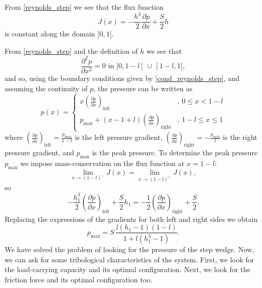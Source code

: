 From \eqref{reynolds_step} we see that the flux function
\begin{equation}
J(x)=-\frac{h^3}{2}\frac{\partial p}{\partial x}+\frac{S}{2}h\label{eq:flux_step}
\end{equation}
is constant along the domain $]0,1[$.

From \eqref{reynolds_step} and the definition of $h$ we see that
\begin{equation*}
\frac{\partial^2 p}{\partial x^2}=0\text{ in }]0,1-l[\,\cup\,]1-l,1[,
\end{equation*}
and so, using the boundary conditions given by \eqref*{cond_reynolds_step}, and assuming the continuity of $p$, the pressure can be written as
\begin{equation}
p(x)=\left\{\begin{array}{ll}
x\left(\frac{\partial p}{\partial x}\right)_\text{left}&,\,0\leq x<1-l\\
p_{\text{max}}+(x-1+l)\left(\frac{\partial p}{\partial x}\right)_\text{right} &,\, 1-l\leq x \leq 1
\end{array}\right.\label{eq:pressure_step_wedge}
\end{equation}
where $\left(\frac{\partial p}{\partial x}\right)_\text{left}=\frac{p_\text{max}}{1-l}$ is the left pressure gradient, $ \left(\frac{\partial p}{\partial x}\right)_\text{right}=-\frac{p_\text{max}}{l}$
is the right pressure gradient, and $p_\text{max}$ is the peak pressure. To determine the peak pressure $p_\text{max}$ we impose mass-conservation on the flux function at $x=1-l$:
\begin{equation*}
\lim_{x\rightarrow(1-l)^-}J(x)=\lim_{x\rightarrow(1-l)^+}J(x),
\end{equation*}
so
\begin{equation*}
-\frac{h_1^3}{2}\left(\frac{\partial p}{\partial x}\right)_\text{left}+\frac{S}{2}h_1=-\frac{1}{2}\left(\frac{\partial p}{\partial x}\right)_\text{right}+\frac{S}{2}.
\end{equation*}
Replacing the expressions of the gradients for both left and right sides we obtain
\begin{equation}
p_\text{max}=S\,\frac{l(h_1-1)(1-l)}{1+l(h_1^3-1)}.\label{eq:pmax_step_wedge}
\end{equation}
We have solved the problem of looking for the pressure of the step wedge. Now, we can ask for some tribological characteristics of the system. First, we look for the load-carrying capacity and its optimal configuration. Next, we look for the friction force and its optimal configuration too.
